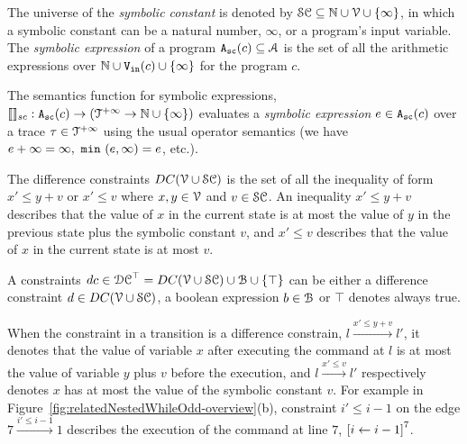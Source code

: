 \begin{defn}
 \label{def:symbolic_expr}
The universe of the \emph{symbolic constant} is denoted by $\mathcal{SC} \subseteq \mathbb{N} \cup \mathcal{V} \cup \{\infty \}$, in which a symbolic constant can be a natural number, $\infty$, or a program's input variable.
 The \emph{symbolic expression} of a program ${\mathtt{A_{sc}}}(c) \subseteq \mathcal{A}$ is the set of all the arithmetic expressions over $\mathbb{N} \cup {\ensuremath{\mathtt{V_{\mathtt{in}}}}}(c) \cup \{\infty \}$ for the program $c$.
\end{defn}
\begin{defn}
    \label{def:symbolic_expr_semantics}
      The semantics function for symbolic expressions, $\llbracket  \rrbracket_{sc}: {\mathtt{A_{sc}}}(c) \to (\mathcal{T}^{+\infty} \to \mathbb{N} \cup \{\infty \})$ evaluates a \emph{symbolic expression}
      $e \in {\ensuremath{\mathtt{A_{sc}}}}(c)$ over a trace $\mathtt{\tau} \in \mathcal{T}^{+\infty}$ using the usual operator semantics (we have 
      $e + \infty = \infty, ~\mathtt{min}~(e, \infty) = e$, etc.).
    \end{defn}
\begin{defn}
 The difference constraints $DC(\mathcal{V} \cup \mathcal{SC})$ is the set of all the inequality of
form $x' \leq y + v$ or $x' \leq v$ where $x, y \in \mathcal{V} $ and $v \in \mathcal{SC}$.
An inequality $x' \leq y + v$ describes that the value of $x$ in the current state is
at most the value of $y$ in the previous state plus the symbolic constant $v$, and $x' \leq v$ describes that the value of $x$ in the current state is
at most $v$.
\end{defn}

\begin{defn}[Constraints]
A constraints $dc \in \mathcal{DC}^{\top} = DC(\mathcal{V} \cup \mathcal{SC}) \cup \mathcal{B}\cup \{\top\}$ can be either a
difference constraint $d \in DC(\mathcal{V} \cup \mathcal{SC})$, a boolean expression $b \in \mathcal{B}$
or $\top$ denotes always true.
\end{defn}

When the constraint in a transition is a difference constrain, $l \xrightarrow{x' \leq y + v} l'$,
it denotes that
the value of variable $x$
after executing the command at $l$ is at most
the value of variable $y$ plus $v$ before the execution,
and $l \xrightarrow{x' \leq v} l'$ respectively denotes
$x$ has at most
the value of the symbolic constant $v$.
For example in Figure~\ref{fig:relatedNestedWhileOdd-overview}(b), constraint $i' \leq i - 1$ on the edge $7 \xrightarrow{i' \leq i - 1} 1$
describes the execution of
 the command at line $7$, 
$\clabel{\assign{i}{i - 1}}^{7}$. 

